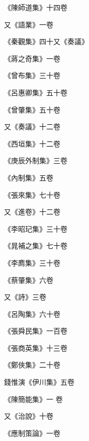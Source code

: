 \begin{pinyinscope}
 《陳師道集》十四卷



 又《語業》一卷



 《秦觀集》四十又《奏議》



 《蔣之奇集》一卷



 《曾布集》三十卷



 《呂惠卿集》五十卷



 《曾肇集》五十卷



 又《奏議》十二卷



 《西垣集》十二卷



 《庚辰外制集》三卷



 《內制集》五卷



 《張來集》七十卷



 又《進卷》十二卷



 《李昭玘集》三十卷



 《晁補之集》七十卷



 《李廌集》三十卷



 《蔡肇集》六卷



 又《詩》三卷



 《呂陶集》六十卷



 《張舜民集》一百卷



 《張商英集》十三卷



 《鄭俠集》二十卷



 錢惟演《伊川集》五卷



 《陳簡能集》一
 卷



 又《治說》十卷



 《應制策論》一卷




\end{pinyinscope}
